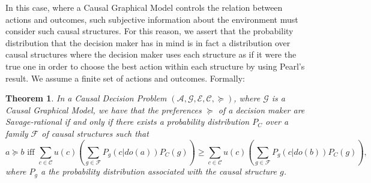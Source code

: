 \documentclass{article}
\theoremstyle{plain}
\newtheorem{teo}{Theorem}
\begin{document}
In this case, where a Causal Graphical Model controls the relation between actions and outcomes, such subjective information about the environment must consider such causal structures. For this reason, we assert that the probability distribution that the decision maker has in mind is in fact a distribution over causal structures where the decision maker uses each structure as if it were the true one in order to choose the best action within each structure by using Pearl's result. We assume a finite set of actions and outcomes. Formally:
\begin{teo}{\label{causal_savage}}
In a Causal Decision Problem  $(\mathcal{A}, \mathcal{G},\mathcal{E},\mathcal{C},\succeq)$, where $\mathcal{G}$ is a Causal Graphical Model, we have that the preferences $\succeq$ of a decision maker are Savage-rational if and only if there exists a probability distribution $P_C$ over a family $\mathcal{F}$ of causal structures such that 
\begin{equation}
a \succeq b \textrm{ iff } \sum_{c \in \mathcal{C}} u(c) \left( \sum_{g \in \mathcal{F}} P_g(c | do(a))P_C(g) \right) \geq \sum_{c \in \mathcal{C}}  u(c) \left( \sum_{g \in \mathcal{F}} P_g(c | do(b))P_C(g) \right),
\end{equation}
where $P_g$ a the probability distribution associated with the causal structure $g$. 
\end{teo}
\end{document}
